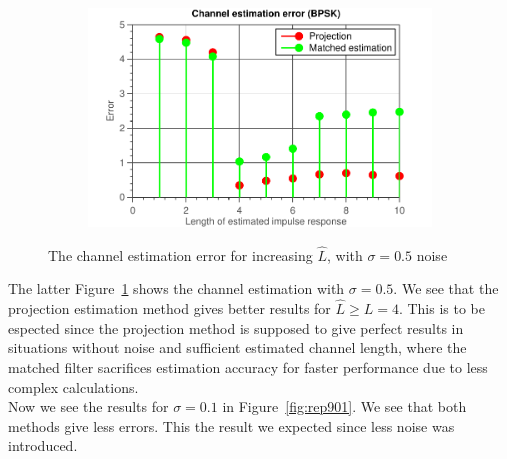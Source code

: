 \documentclass[11pt,titlepage]{report}
\begin{document}
\begin{figure}[H]
\begin{subfigure}{0.49\textwidth}
	\end{subfigure}
	\begin{subfigure}{0.49\textwidth}
		\includegraphics[width=\textwidth]{../../deliverable-7-resources/figures/ass-1/report-8-9-10/report-9-noise-0.5/ass-1-report-9-BPSK.pdf}
	\end{subfigure}
	\caption{The channel estimation error for increasing $\hat{L}$,  with $\sigma = 0.5$ noise}
	\label{fig:rep905}
\end{figure}

The latter Figure~\ref{fig:rep905} shows the channel estimation with $\sigma = 0.5$. We see that the projection estimation method gives better results for $\hat{L} \ge L = 4$. This is to be espected since the projection method is supposed to give perfect results in situations without noise and sufficient estimated channel length, where the matched filter sacrifices estimation accuracy for faster performance due to less complex calculations. \\
Now we see the results for $\sigma = 0.1$ in  Figure~\ref{fig:rep901}. We see that both methods give less errors. This the result we expected since less noise was introduced.
\end{document}

